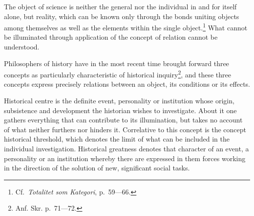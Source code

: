 \documentclass[12pt]{article}
\begin{document}
The object of science is neither the general nor the individual in and for
itself alone, but reality, which can be known only through the bonds uniting
objects among themselves as well as the elements within the single
object.\footnote{Cf.\ \textit{Totalitet som Kategori}, p.~59---66.} What
cannot be illuminated through application of the concept of relation cannot
be understood.

Philosophers of history have in the most recent time brought forward three
concepts as particularly characteristic of historical inquiry\footnote{Anf.
Skr. p.~71---72.}, and these three concepts express precisely relations
between an object, its conditions or its effects.

Historical centre is the definite event, personality or institution whose
origin, subsistence and development the historian wishes to investigate.
About it one gathers everything that can contribute to its illumination, but
takes no account of what neither furthers nor hinders it. Correlative to
this concept is the concept historical threshold, which denotes the limit of
what can be included in the individual investigation. Historical greatness
denotes that character of an event, a personality or an institution whereby
there are expressed in them forces working in the direction of the solution
of new, significant social tasks.
\end{document}
